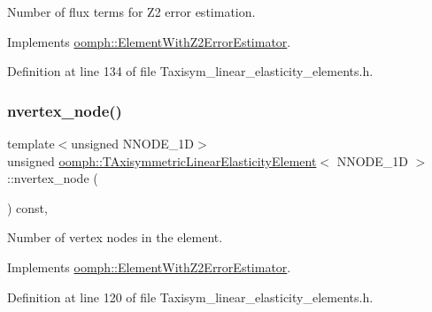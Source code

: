 Number of \textquotesingle{}flux\textquotesingle{} terms for Z2 error estimation. 



Implements \hyperlink{classoomph_1_1ElementWithZ2ErrorEstimator_ae82c5728902e13da31be19c390fc28e3}{oomph\+::\+Element\+With\+Z2\+Error\+Estimator}.



Definition at line 134 of file Taxisym\+\_\+linear\+\_\+elasticity\+\_\+elements.\+h.

\mbox{\label{classoomph_1_1TAxisymmetricLinearElasticityElement_a622394d7222ff94019c022ae0cc5bf21}} 
\subsubsection{\texorpdfstring{nvertex\+\_\+node()}{nvertex\_node()}}
{\footnotesize\ttfamily template$<$unsigned N\+N\+O\+D\+E\+\_\+1D$>$ \\
unsigned \hyperlink{classoomph_1_1TAxisymmetricLinearElasticityElement}{oomph\+::\+T\+Axisymmetric\+Linear\+Elasticity\+Element}$<$ N\+N\+O\+D\+E\+\_\+1D $>$\+::nvertex\+\_\+node (\begin{DoxyParamCaption}{ }\end{DoxyParamCaption}) const\hspace{0.3cm}{\ttfamily [inline]}, {\ttfamily [virtual]}}



Number of vertex nodes in the element. 



Implements \hyperlink{classoomph_1_1ElementWithZ2ErrorEstimator_a19495a0e77ef4ff35f15fdf7913b4077}{oomph\+::\+Element\+With\+Z2\+Error\+Estimator}.



Definition at line 120 of file Taxisym\+\_\+linear\+\_\+elasticity\+\_\+elements.\+h.

\mbox{\label{classoomph_1_1TAxisymmetricLinearElasticityElement_a985cc21365c01fe374964f4d063dd5e3}} 
